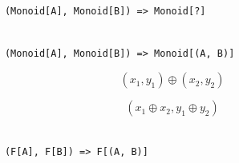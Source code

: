 \documentclass{beamer}
\begin{document}
\begin{frame}[fragile]

  \centering
  \large

  \begin{minipage}{0.85\textwidth}
    \begin{verbatim}

      (Monoid[A], Monoid[B]) => Monoid[?]

    \end{verbatim}
  \end{minipage}

\end{frame}

\begin{frame}[fragile]

  \centering
  \large

  \begin{minipage}{0.95\textwidth}
    \begin{verbatim}

      (Monoid[A], Monoid[B]) => Monoid[(A, B)]

    \end{verbatim}
  \end{minipage}

\end{frame}

\begin{frame}[fragile]

  \Large

  $$ (x_{1}, y_{1}) \oplus (x_{2}, y_{2}) $$

\end{frame}

\begin{frame}[fragile]

  \centering
  \Large

  $$ (x_{1} \oplus x_{2}, y_{1} \oplus y_{2}) $$

\end{frame}

\begin{frame}[fragile]

  \centering
  \large

  \begin{minipage}{0.65\textwidth}
    \begin{verbatim}

      (F[A], F[B]) => F[(A, B)]

    \end{verbatim}
  \end{minipage}

\end{frame}
\end{document}
